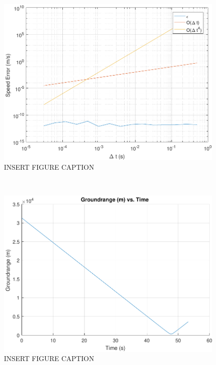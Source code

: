 \begin{figure}[H]
	\centering
	\begin{minipage}{4.5 in}
		\includegraphics[width=\linewidth]{Figures/convtestvac.pdf}
		\caption{INSERT FIGURE CAPTION \label{fig:convtestvac} }
	\end{minipage}
\end{figure}






\












\begin{figure}[H]
	\centering
	\begin{minipage}{4.5 in}
		\includegraphics[width=\linewidth]{Figures/trajunpowvacgr.pdf}
		\caption{INSERT FIGURE CAPTION \label{fig:trajunpowvacgr} }
	\end{minipage}
\end{figure}





